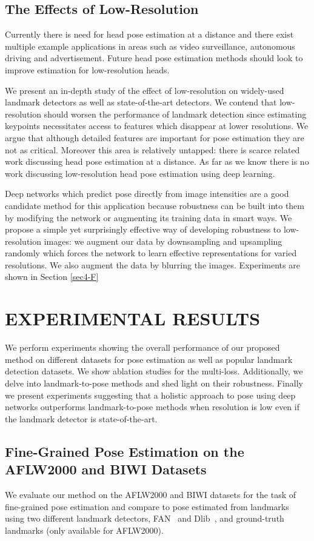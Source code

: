 \documentclass[10pt,twocolumn,letterpaper]{article}
\begin{document}
\subsection{The Effects of Low-Resolution}\label{sec3-E}
Currently there is need for head pose estimation at a distance and there exist multiple example applications in areas such as video surveillance, autonomous driving and advertisement. Future head pose estimation methods should look to improve estimation for low-resolution heads.

We present an in-depth study of the effect of low-resolution on widely-used landmark detectors as well as state-of-the-art detectors. We contend that low-resolution should worsen the performance of landmark detection since estimating keypoints necessitates access to features which disappear at lower resolutions. We argue that although detailed features are important for pose estimation they are not as critical. Moreover this area is relatively untapped: there is scarce related work discussing head pose estimation at a distance. As far as we know there is no work discussing low-resolution head pose estimation using deep learning.

Deep networks which predict pose directly from image intensities are a good candidate method for this application because robustness can be built into them by modifying the network or augmenting its training data in smart ways. We propose a simple yet surprisingly effective way of developing robustness to low-resolution images: we augment our data by downsampling and upsampling randomly which forces the network to learn effective representations for varied resolutions. We also augment the data by blurring the images. Experiments are shown in Section \ref{sec4-F}

\section{EXPERIMENTAL RESULTS}\label{sec4}
We perform experiments showing the overall performance of our proposed method on different datasets for pose estimation as well as popular landmark detection datasets. We show ablation studies for the multi-loss. Additionally, we delve into landmark-to-pose methods and shed light on their robustness. Finally we present experiments suggesting that a holistic approach to pose using deep networks outperforms landmark-to-pose methods when resolution is low even if the landmark detector is state-of-the-art.

\subsection{Fine-Grained Pose Estimation on the AFLW2000 and BIWI Datasets}\label{sec4-A}
We evaluate our method on the AFLW2000 and BIWI datasets for the task of fine-grained pose estimation and compare to pose estimated from landmarks using two different landmark detectors, FAN~\cite{bulat2017far} and Dlib~\cite{kazemi2014one}, and ground-truth landmarks (only available for AFLW2000).
\end{document}
